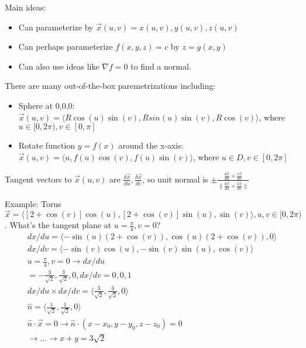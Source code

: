 \documentclass[11pt, oneside]{article}   	%
\begin{document}
Main ideas:
\begin{itemize}
\item Can parameterize by $\overrightarrow{x}(u,v) = x(u,v), y(u,v), z(u,v)$
\item Can perhaps parameterize $f(x,y,z) = c$ by $z = g(x,y)$
\item Can also use ideas like $\nabla f = 0$ to find a normal.
\end{itemize}

There are many out-of-the-box paremetrizations including:

\begin{itemize}
\item Sphere at 0,0,0: $\overrightarrow{x}(u,v) = \langle R\cos(u)\sin(v), Rsin(u)\sin(v), R\cos(v)\rangle$, where $u \in [0, 2\pi), v \in [0, \pi]$
\item Rotate function $y = f(x)$ around the x-axis: $\overrightarrow{x}(u,v) = \langle u, f(u)\cos(v), f(u)\sin(v) \rangle$, where $u \in D, v \in [0, 2\pi]$
\end{itemize}

Tangent vectors to $\overrightarrow{x}(u,v)$ are $\frac{\delta \overrightarrow{x}} {du}, \frac{\delta \overrightarrow{x}} {dv}$, so unit normal is 	$\pm \frac 
					{\frac{d \overrightarrow{x}} {du} \times \frac{\delta \overrightarrow{x}}{dv}}
					{\| \frac{d \overrightarrow{x}} {du} \times \frac{\delta \overrightarrow{x}}{dv} \|}
					$
					
Example: Torus $\overrightarrow{x} = \langle [2 + \cos(v)]\cos(u),  [2 + \cos(v)]\sin(u), \sin(v)\rangle, u,v \in [0,2 \pi)$.  What's the tangent plane at $u = \frac{\pi}{4}, v=0$?
\begin{align}
dx/du = \langle -\sin(u)(2 + \cos(v)),  \cos(u)(2 + \cos(v)), 0 \rangle \\
dx/dv = \langle -\sin(v)\cos(u), -\sin(v)\sin(u), \cos(v) \rangle \\
u = \frac{\pi}{4}, v=0 \rightarrow dx/du  \\
= -\frac{3}{\sqrt{2}}, \frac{3}{\sqrt{2}}, 0, dx/dv = 0, 0, 1 \\
dx/du \times dx/dv = \langle  \frac{3}{\sqrt{2}}, \frac{3}{\sqrt{2}}, 0\rangle \\
\hat{n} =  \langle \frac{1}{\sqrt{2}}, \frac{1}{\sqrt{2}}, 0 \rangle \\
\hat{n}  \cdot \overrightarrow{x} = 0 \rightarrow \hat{n} \cdot (x - x_0, y-y_0, z-z_0) = 0 \\
\rightarrow ... \rightarrow x + y = 3\sqrt{2}  \\
\end{align}
\end{document}
